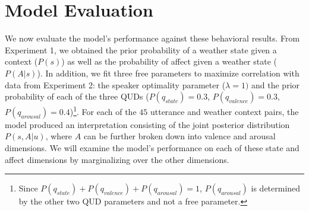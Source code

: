 \documentclass[10pt,letterpaper]{article}
\begin{document}
\section{Model Evaluation}
We now evaluate the model's performance against these behavioral results. From Experiment 1, we obtained the prior probability of a weather state given a context ($P(s)$) as well as the probability of affect given a weather state ($P(A | s)$). In addition, we fit three free parameters to maximize correlation with data from Experiment 2: the speaker optimality parameter ($\lambda = 1)$ and the prior probability of each of the three QUDs ($P(q_{state}) = 0.3$, $P(q_{valence}) = 0.3$, $P(q_{arousal}) = 0.4$)\footnote{Since $P(q_{state}) + P(q_{valence}) + P(q_{arousal}) = 1$, $P(q_{arousal})$ is determined by the other two QUD parameters and not a free parameter.}.
For each of the $45$ utterance and weather context pairs, the model produced an interpretation consisting of the joint posterior distribution $P(s, A | u)$, where $A$ can be further broken down into valence and arousal dimensions. We will examine the model's performance on each of these state and affect dimensions by marginalizing over the other dimensions.
\end{document}
